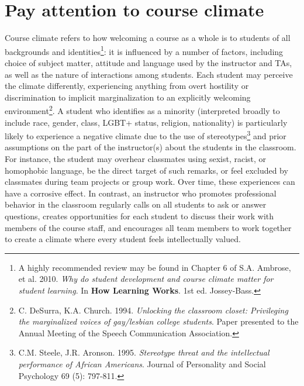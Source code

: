 \section {Pay attention to course climate}
\label{course-climate}
Course climate refers to how welcoming a course as a whole is to students of all backgrounds and identities\footnote{A highly recommended review may be found in Chapter 6 of S.A. Ambrose, et al. 2010. \emph{Why do student development and course climate matter for student learning}. In \textbf{How Learning Works}. 1st ed. Jossey-Bass.}: it is influenced by a number of factors, including choice of subject matter, attitude and language used by the instructor and TAs, as well as the nature of interactions among students. Each student may perceive the climate differently, experiencing anything from overt hostility or discrimination to implicit marginalization to an explicitly welcoming environment\footnote{C. DeSurra, K.A. Church. 1994. \emph{Unlocking the classroom closet: Privileging the marginalized voices of gay/lesbian college students}. Paper presented to the Annual Meeting of the Speech Communication Association.}. A student who identifies as a minority (interpreted broadly to include race, gender, class, LGBT+ status, religion, nationality) is particularly likely to experience a negative climate due to the use of stereotypes\footnote{C.M. Steele, J.R. Aronson. 1995. \emph{Stereotype threat and the intellectual performance of African Americans}. Journal of Personality and Social Psychology 69 (5): 797-811.} and prior assumptions on the part of the instructor(s) about the students in the classroom. For instance, the student may overhear classmates using sexist, racist, or homophobic language, be the direct target of such remarks, or feel excluded by classmates during team projects or group work. Over time, these experiences can have a corrosive effect.   In contrast, an instructor who promotes professional behavior in the classroom regularly calls on all students to ask or answer questions, creates opportunities for each student to discuss their work with members of the course staff, and encourages all team members to work together to create a climate where every student feels intellectually valued.

